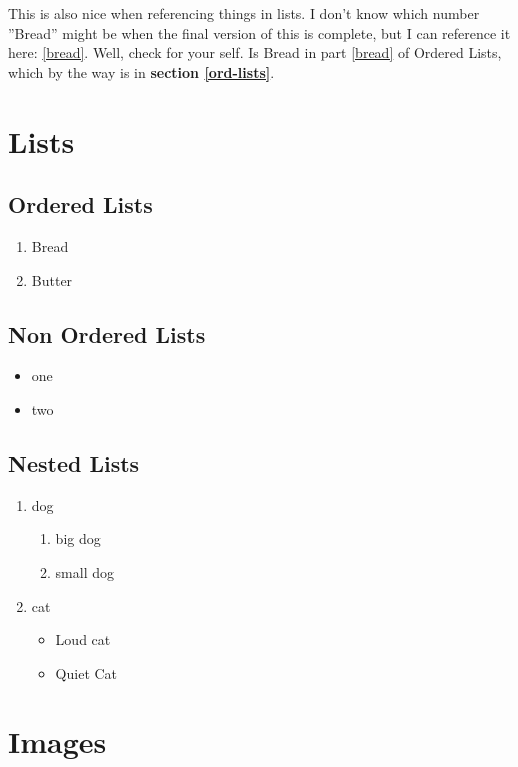 \documentclass{article}
\begin{document}
\noindent
This is also nice when referencing things in lists. I don't know
which number ''Bread'' might be when the final version of this 
is complete, but I can reference it here: \ref{bread}. Well,
check for your self. Is Bread in part \ref{bread} of Ordered Lists,
which by the way is in \textbf{section \ref{ord-lists}}.

\section{Lists\label{lists}}
    \subsection{Ordered Lists\label{ord-lists}}
        \begin{enumerate}
            \item Bread\label{bread}
            \item Butter
        \end{enumerate}
    \subsection{Non Ordered Lists}
        \begin{itemize}
            \item one
            \item two
        \end{itemize}
    \subsection{Nested Lists}
        \begin{enumerate}
            \item dog
                \begin{enumerate}
                    \item big dog
                    \item small dog
                \end{enumerate}
            \item cat
                \begin{itemize}
                    \item Loud cat
                    \item Quiet Cat
                \end{itemize}
        \end{enumerate}

\section{Images}
\end{document}
